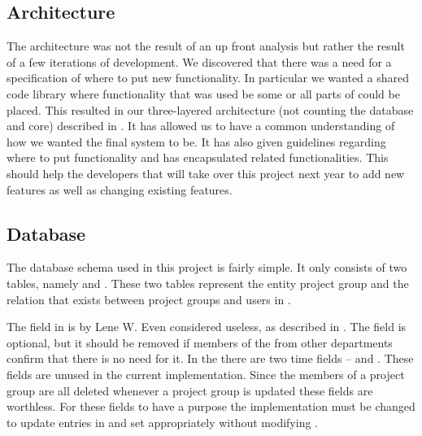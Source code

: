 \subsection{Architecture}



The architecture was not the result of an up front analysis but rather the result of a few iterations of development.
We discovered that there was a need for a specification of where to put new functionality.
In particular we wanted a shared code library where functionality that was used be some or all parts of \system{} could be placed.
This resulted in our three-layered architecture (not counting the database and \moodle{} core) described in .
It has allowed us to have a common understanding of how we wanted the final system to be.
It has also given guidelines regarding where to put functionality and has encapsulated related functionalities.
This should help the developers that will take over this project next year to add new features as well as changing existing features.



\subsection{Database}
The database schema used in this project is fairly simple.
It only consists of two tables, namely   and . 
These two tables represent the entity project group and the relation that exists between project groups and users in \moodle{}. 

The  field in  is by Lene W. Even considered useless, as described in . 
The field is optional, but it should be removed if members of the \admpers{} from other departments confirm that there is no need for it. 
In the  there are two time fields --  and . 
These fields are unused in the current implementation. 
Since the members of a project group are all deleted whenever a project group is updated these fields are worthless.
For these fields to have a purpose the implementation must be changed to update entries in  and set  appropriately without modifying .


